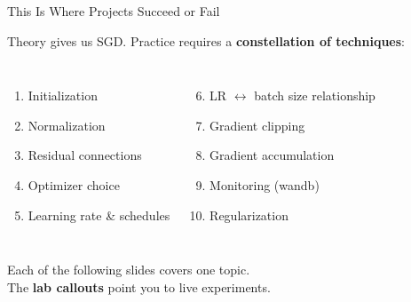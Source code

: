\documentclass[aspectratio=169, 10pt]{beamer}
\newcommand{\keyword}[1]{\textcolor{ColumbiaBlue}{\textbf{#1}}}
\begin{document}
\begin{frame}{This Is Where Projects Succeed or Fail}

Theory gives us SGD.
Practice requires a \keyword{constellation of techniques}:

\vspace{4pt}
\begin{columns}[T]
\begin{enumerate}
  \item Initialization
  \item Normalization
  \item Residual connections
  \item Optimizer choice
  \item Learning rate \& schedules
\end{enumerate}

\begin{enumerate}\setcounter{enumi}{5}
  \item LR $\leftrightarrow$ batch size relationship
  \item Gradient clipping
  \item Gradient accumulation
  \item Monitoring (wandb)
  \item Regularization
\end{enumerate}
\end{columns}

\vspace{8pt}
Each of the following slides covers one topic. \\
The \textcolor{AccentOrange}{} \textbf{lab callouts} point you to live experiments.

\end{frame}

\end{document}
